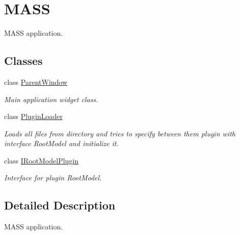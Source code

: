 \hypertarget{group__mass}{}\section{M\+A\+SS}
\label{group__mass}


M\+A\+SS application.  


\subsection*{Classes}
\begin{DoxyCompactItemize}
\item 
class \hyperlink{class_parent_window}{Parent\+Window}
\begin{DoxyCompactList}\small\item\em Main application widget class. \end{DoxyCompactList}\item 
class \hyperlink{class_plugin_loader}{Plugin\+Loader}
\begin{DoxyCompactList}\small\item\em Loads all files from directory and tries to specify between them plugin with interface Root\+Model and initialize it. \end{DoxyCompactList}\item 
class \hyperlink{class_i_root_model_plugin}{I\+Root\+Model\+Plugin}
\begin{DoxyCompactList}\small\item\em Interface for plugin Root\+Model. \end{DoxyCompactList}\end{DoxyCompactItemize}


\subsection{Detailed Description}
M\+A\+SS application. 

